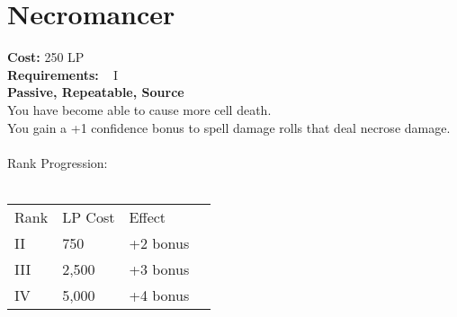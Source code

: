 \section{Necromancer}\label{perk:necromancer}
\textbf{Cost:} 250 LP\\
\textbf{Requirements:} ~ I\\
\textbf{Passive, Repeatable, Source}\\
You have become able to cause more cell death.\\
You gain a +1 confidence bonus to spell damage rolls that deal necrose damage.\\
\\
Rank Progression:\\
\\
\begin{tabular}{l | l | l | l}
    Rank & LP Cost &  Effect\\
    II & 750 & +2 bonus\\
    III & 2,500 & +3 bonus\\
    IV & 5,000 & +4 bonus\\
\end{tabular}